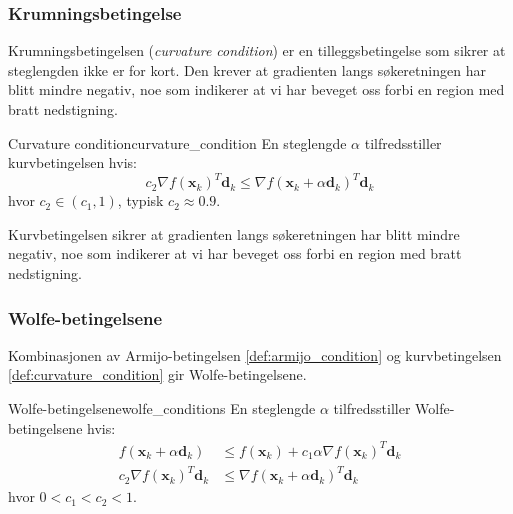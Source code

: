 \subsubsection{Krumningsbetingelse}
\label{subsubsec:curvature_condition}
Krumningsbetingelsen (\emph{curvature condition}) er en tilleggsbetingelse som sikrer at steglengden ikke er for kort.
Den krever at gradienten langs søkeretningen har blitt mindre negativ, noe som indikerer at vi har beveget oss forbi en region med bratt nedstigning.

\begin{definition}{Curvature condition}{curvature_condition}
	En steglengde \(\alpha\) tilfredsstiller kurvbetingelsen hvis:
	\begin{equation}\label{eq:curvature_condition}
		c_2 \nabla f(\symbf{x}_k)^T \symbf{d}_k \leq \nabla f(\symbf{x}_k + \alpha \symbf{d}_k)^T \symbf{d}_k
	\end{equation}
	hvor \(c_2 \in (c_1, 1)\), typisk \(c_2 \approx 0.9\).
\end{definition}

Kurvbetingelsen sikrer at gradienten langs søkeretningen har blitt mindre negativ, noe som indikerer at vi har beveget oss forbi en region med bratt nedstigning.

\subsubsection{Wolfe-betingelsene}
\label{subsubsec:wolfe_conditions}

Kombinasjonen av Armijo-betingelsen \ref{def:armijo_condition} og kurvbetingelsen \ref{def:curvature_condition} gir Wolfe-betingelsene.

\begin{definition}{Wolfe-betingelsene}{wolfe_conditions}
	En steglengde \(\alpha\) tilfredsstiller Wolfe-betingelsene hvis:
	\begin{align}
		f(\symbf{x}_k + \alpha\symbf{d}_k)    & \leq f(\symbf{x}_k) + c_1\alpha\nabla f(\symbf{x}_k)^T\symbf{d}_k \tag{(Armijo)}    \\
		c_2\nabla f(\symbf{x}_k)^T\symbf{d}_k & \leq \nabla f(\symbf{x}_k + \alpha\symbf{d}_k)^T\symbf{d}_k  \tag{(Kurvbetingelse)}
	\end{align}
	hvor \(0 < c_1 < c_2 < 1\).
\end{definition}

